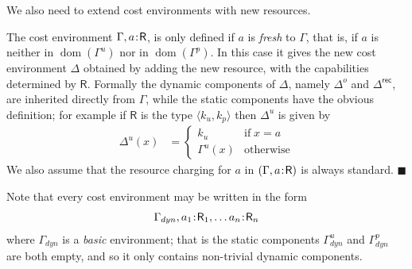 \documentclass{LMCS}
\newcommand{\record}{{\scriptstyle \mathsf{rec}}}
\newcommand{\Gammadyn}{\Gamma_{\scriptstyle dyn}}
\def\pair(#1,#2){\langle #1 , #2 \rangle}\newcommand{\parrow}{ \mathbin{\rightharpoonup}}
\newcommand{\dom}[1]{\mathop{\text{dom}}(#1)}
\newcommand{\typeletter}[1]{{\mathsf{#1}}}
\newcommand{\tR}{\typeletter{R}}
\newcommand{\Cassoc}[2]{ {{#1}\kern -0.2em : \kern -0.2em {#2}}}
\newcommand{\EndDefBox}{\null\hfill$\blacksquare$}
\newcommand{\boxHere}{\global\let\EndProof\empty\EndDefBox}
\begin{document}
\noindent
We also need to extend cost environments with new resources.
\begin{defi}\label{def:resourcereg}
  The cost environment $\Gamma, \Cassoc{a}{\tR}$, is only defined if
  $a$ is \emph{fresh} to $\Gamma$, that is, if $a$ is neither in
  $\dom{\Gamma^u}$ nor in $\dom{\Gamma^p}$. In this case it gives the new
  cost environment $\Delta$ obtained by adding the new resource, with
  the capabilities determined by $\tR$.  Formally the dynamic components
of $\Delta$, namely $\Delta^o$ and $\Delta^\record$, are inherited directly
from $\Gamma$, while the static components have the obvious definition; for 
example if $\tR$ is the type $\pair(k_u,k_p)$ then $\Delta^u$ is given by
\begin{align*}
  \Delta^u(x) &= \begin{cases}
                       k_u  & \text{if}\; x=a\\
                       \Gamma^u(x) &\text{otherwise}
                 \end{cases}
\end{align*}
We also assume that the  resource charging for $a$
  in $(\Gamma,\Cassoc{a}{\tR})$ is always standard. \boxHere
\end{defi}

\noindent
Note that every cost environment may be written in the form
\begin{align*}
  \Gammadyn, \Cassoc{a_1}{\tR_1},\ldots \Cassoc{a_n}{\tR_n}
\end{align*}
where $\Gammadyn$  is a \emph{basic} environment;
that is the static components $\Gammadyn^u$ and $\Gammadyn^p$
are both empty, and so it 
only contains  non-trivial dynamic components. 
\end{document}
